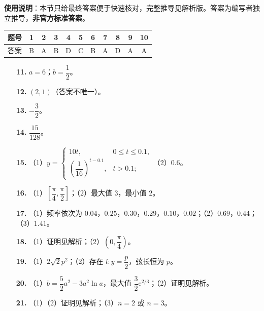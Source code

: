 
\begin{gknotice}
\textbf{使用说明}：本节只给最终答案便于快速核对，完整推导见解析版。答案为编写者独立推导，\textbf{非官方标准答案}。
\end{gknotice}

\begin{center}\begin{tabular}{ccccccccccc}
\toprule
题号 & 1 & 2 & 3 & 4 & 5 & 6 & 7 & 8 & 9 & 10 \\
\midrule
答案 & B & A & B & D & C & B & A & D & A & A \\
\bottomrule
\end{tabular}\end{center}

\begin{itemize}[leftmargin=2.6em]
  \item[\textbf{11.}] $a=6$；$b=\dfrac12$。
  \item[\textbf{12.}] $(2,1)$（答案不唯一）。
  \item[\textbf{13.}] $-\dfrac32$。
  \item[\textbf{14.}] $\dfrac{15}{128}$。
  \item[\textbf{15.}] （1）$y=\begin{cases}10t,&0\leqslant t\leqslant0.1,\\ \left(\dfrac1{16}\right)^{t-0.1},&t>0.1;\end{cases}$（2）$0.6$。
\end{itemize}

\begin{itemize}[leftmargin=2.6em]
  \item[\textbf{16.}] （1）$\left[\dfrac{\pi}4,\dfrac{\pi}2\right]$；（2）最大值 $3$，最小值 $2$。
  \item[\textbf{17.}] （1）频率依次为 $0.04$，$0.25$，$0.30$，$0.29$，$0.10$，$0.02$；（2）$0.69$，$0.44$；（3）$1.41$。
  \item[\textbf{18.}] （1）证明见解析；（2）$\left(0,\dfrac{\pi}4\right)$。
  \item[\textbf{19.}] （1）$2\sqrt2p^2$；（2）存在 $l:y=\dfrac p2$，弦长恒为 $p$。
  \item[\textbf{20.}] （1）$b=\dfrac52a^2-3a^2\ln a$，最大值 $\dfrac32\mathrm e^{2/3}$；（2）证明见解析。
  \item[\textbf{21.}] （1）（2）证明见解析；（3）$n=2$ 或 $n=3$。
\end{itemize}
